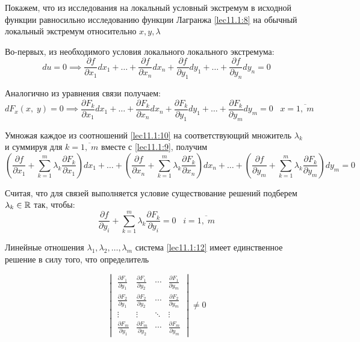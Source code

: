 \documentclass[../../main.tex]{subfiles}
\begin{document}
	
	Покажем, что из исследования на локальный условный экстремум в исходной 
	функции равносильно исследованию функции Лагранжа 
	\eqref{lec11.1:8} на обычный локальный экстремум относительно $x, y,\lambda$
	
	Во-первых, из необходимого условия локального локального экстремума:
	\[
	du = 0 \implies \dfrac{\partial f}{\partial x_1} dx_1 + \ldots + 
	\dfrac{\partial f}{\partial x_n} dx_n + \dfrac{\partial f}{\partial y_1}dy_1
	 + \ldots + \dfrac{\partial f}{\partial y_n} dy_n = 0 \label{lec11.1:9}
	\]
	
	Аналогично из уравнения связи получаем:
	\begin{equation}
	dF_x\left(x, \; y\right) = 0 \implies \dfrac{\partial 
	F_k}{\partial x_1}dx_1 + 
	\ldots + \dfrac{\partial F_k}{\partial x_n}dx_n + 
	\dfrac{\partial F_k}{\partial y_1}dy_1 + \ldots + 
	\dfrac{\partial F_k}{\partial y_m}dy_m = 0 \;\;\; x = \overline{1, \; m} 
	\label{lec11.1:10}
	\end{equation}
	
	Умножая каждое из соотношений \eqref{lec11.1:10} на соответствующий множитель 
	$\lambda_k$ и суммируя для $k = \overline{1,\;m}$ 
	вместе с \eqref{lec11.1:9}, получим
	\begin{equation}
	\left(\dfrac{\partial f}{\partial x_1} + \sum\limits_{k
	= 1}^m \lambda_k \dfrac{\partial F_k}{\partial x_1} 
	\right)dx_1 + \ldots + \left(\dfrac{\partial f}
	{\partial x_n} + \sum\limits_{k = 1}^m \lambda_k 
	\dfrac{\partial F_k}{\partial x_n} \right)dx_n + \ldots 
	+ \left(\dfrac{\partial f}{\partial y_m} + 
	\sum\limits_{k = 1}^m \lambda_k \dfrac{\partial F_k}
	{\partial y_m} \right)dy_m = 0 \label{lec11.1:11}
	\end{equation}
	
	Считая, что для связей выполняется условие существование 
	решений подберем $\lambda_k \in \mathbb{R}$ так, чтобы:
	\begin{equation}
	\dfrac{\partial f}{\partial y_i} + \sum\limits_{k = 1}^m \lambda_k 
	\dfrac{\partial F_k}{\partial y_i} = 0 \;\;\; i = \overline{1, \; m} 
	\label{lec11.1:12}
	\end{equation}
	
	Линейные отношения $\lambda_1, \lambda_2, \ldots, \lambda_m$ система 
	\eqref{lec11.1:12} имеет единственное решение в силу того, что определитель
	
	\[
	\begin{vmatrix}
	\frac{\partial F_1}{\partial y_1} & \frac{\partial F_1}{\partial y_2}
	& \cdots & \frac{\partial F_1}{\partial y_m} \\
	\frac{\partial F_2}{\partial y_1} & \frac{\partial F_2}{\partial y_2} 
	& \cdots & \frac{\partial F_2}{\partial y_m} \\
	\vdots  & \vdots  & \ddots & \vdots  \\
	\frac{\partial F_m}{\partial y_1} & \frac{\partial F_m}{\partial y_2}
	& \cdots & \frac{\partial F_m}{\partial y_m}
	\end{vmatrix} \ne 0 
	\]
	\smallskip
	
\end{document}
